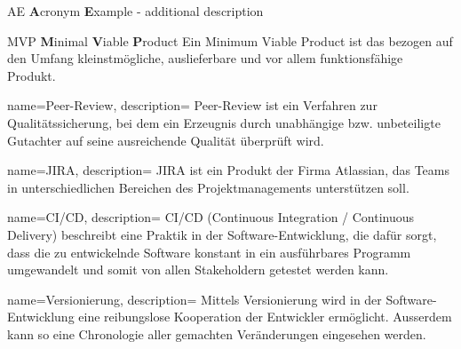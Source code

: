 %
%


\usepackage{xparse}

 {
	\makeglossaries
}





{AE}
{\textbf{A}cronym \textbf{E}xample - additional description}





{MVP}
{\textbf{M}inimal \textbf{V}iable \textbf{P}roduct}
{
	Ein Minimum Viable Product ist das bezogen auf den Umfang kleinstmögliche, auslieferbare und vor allem funktionsfähige Produkt.
}





{
	name=Peer-Review,
	description={
		Peer-Review ist ein Verfahren zur Qualitätssicherung, bei dem ein Erzeugnis durch unabhängige bzw. unbeteiligte Gutachter auf seine ausreichende Qualität überprüft wird.
	}
}



{
	name=JIRA,
	description={
		JIRA ist ein Produkt der Firma Atlassian, das Teams in unterschiedlichen Bereichen des Projektmanagements unterstützen soll.
	}
}


{
	name=CI/CD,
	description={
		CI/CD (Continuous Integration / Continuous Delivery) beschreibt eine Praktik in der Software-Entwicklung, die dafür sorgt, dass die zu entwickelnde Software konstant in ein ausführbares Programm umgewandelt und somit von allen Stakeholdern getestet werden kann.
	}
}

{
	name=Versionierung,
	description={
		Mittels Versionierung wird in der Software-Entwicklung eine reibungslose Kooperation der Entwickler ermöglicht. Ausserdem kann so eine Chronologie aller gemachten Veränderungen eingesehen werden.
	}
}

